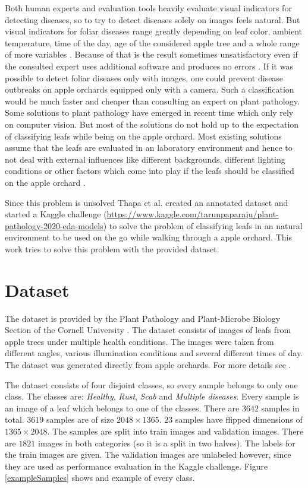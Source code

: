 \documentclass[10pt,twocolumn,letterpaper]{article}
\begin{document}
Both human experts and evaluation tools heavily evaluate visual indicators for detecting diseases, so to try to detect diseases solely on images feels natural. But visual indicators for foliar diseases range greatly depending on leaf color, ambient temperature, time of the day, age of the considered apple tree and a whole range of more variables \cite{dai2019high, thapa2020plant}. Because of that is the result sometimes unsatisfactory even if the consulted expert uses additional software and produces no errors \cite{thapa2020plant}. If it was possible to detect foliar diseases only with images, one could prevent disease outbreaks on apple orchards equipped only with a camera. Such a classification would be much faster and cheaper than consulting an expert on plant pathology. Some solutions to plant pathology have emerged in recent time which only rely on computer vision. But most of the solutions do not hold up to the expectation of classifying leafs while being on the apple orchard. Most existing solutions assume that the leafs are evaluated in an laboratory environment and hence to not deal with external influences like different backgrounds, different lighting conditions or other factors which come into play if the leafs should be classified on the apple orchard \cite{barbedo2014automatic, mohanty2016using, liu2018identification, dubey2016apple}.

Since this problem is unsolved Thapa et al. \cite{thapa2020plant} created an annotated dataset and started a Kaggle challenge (\url{https://www.kaggle.com/tarunpaparaju/plant-pathology-2020-eda-models}) to solve the problem of classifying leafs in an natural environment to be used on the go while walking through a apple orchard. This work tries to solve this problem with the provided dataset.
\section{Dataset}
The dataset is provided by the Plant Pathology and Plant-Microbe Biology Section of the Cornell University  \cite{thapa2020plant}. The dataset consists of images of leafs from apple trees under multiple health conditions. The images were taken from different angles, various illumination conditions  and several  different times of day. The dataset was generated directly from apple orchards. For more details see \cite{thapa2020plant}. 

The dataset consists of four disjoint classes, so every sample belongs to only one class. The classes are: \textit{Healthy}, \textit{Rust}, \textit{Scab} and \textit{Multiple diseases}. Every sample is an image of a leaf which belongs to one of the classes. There are $3642$ samples in total. $3619$ samples are of size $2048 \times 1365$. $23$ samples have flipped dimensions of $1365 \times 2048$. The samples are split into train images and validation images. There are $1821$ images in both categories (so it is a split in two halves). The labels for the train images are given. The validation images are unlabeled however, since they are used as performance evaluation in the Kaggle challenge. Figure \ref{exampleSamples} shows and example of every class.
\end{document}
